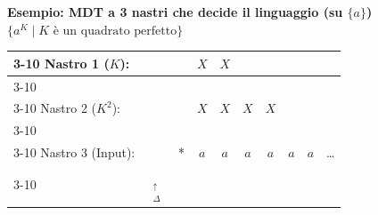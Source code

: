 \vspace{0.6cm}
\textbf{Esempio: MDT a 3 nastri che decide il linguaggio (su $\{a\}$) $\{a^K \mid K \text{ è un quadrato perfetto}\}$}

\begin{center}
\begin{tabular}{ll|c|c|c|c|c|c|c|c}
\cline{3-10}
Nastro 1 ($K$): & \qquad & & $X$ & $X$ & \multicolumn{5}{c}{} \\
\cline{3-10}
\multicolumn{10}{c}{} \\
\cline{3-10}
Nastro 2 ($K^2$): & \qquad & & $X$ & $X$ & $X$ & $X$ & \multicolumn{3}{c}{} \\
\cline{3-10}
\multicolumn{10}{c}{} \\
\cline{3-10}
Nastro 3 (Input): & \qquad & * & $a$ & $a$ & $a$ & $a$ & $a$ & $a$ & \dots \\
\cline{3-10}
\multicolumn{2}{c}{} & \multicolumn{1}{c}{$\underset{\substack{\uparrow \\ \Delta}}{\phantom{*}}$} & \multicolumn{7}{c}{} \\
\end{tabular}
\end{center}

